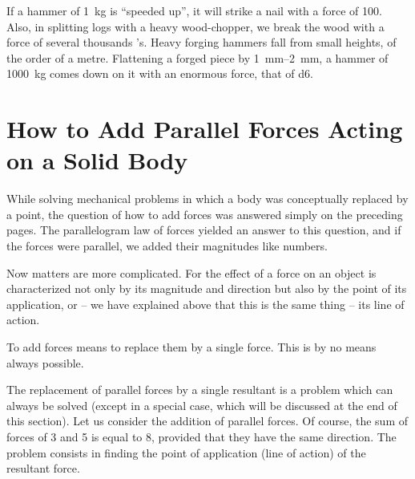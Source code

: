 If a hammer of \SI{1}{\kilo\gram} is ``speeded up'', it will strike a
nail with a force of \SI{100}{\kgf}. Also, in splitting logs with
a heavy wood-chopper, we break the wood with a force of
several thousands \si{\kgf}'s. Heavy forging hammers fall
from small heights, of the order of a metre. Flattening
a forged piece by \SIrange{1}{2}{\milli\meter}, a hammer of \SI{1000}{\kilo\gram} comes
down on it with an enormous force, that of \SI{d6}{\kgf}.

\section[Adding Parallel Forces Acting on a Solid Body]{How to Add Parallel Forces Acting on a Solid Body}

While solving mechanical problems in which a body
was conceptually replaced by a point, the question of
how to add forces was answered simply on the preceding
pages. The parallelogram law of forces yielded an answer
to this question, and if the forces were parallel, we added
their magnitudes like numbers.

Now matters are more complicated. For the effect of a force on an object is characterized not only by its magnitude and direction but also by the point of its application, or -- we have explained above that this is the same thing -- its line of action.

To add forces means to replace them by a single force. This is by no means always possible.

The replacement of parallel forces by a single resultant
is a problem which can always be solved (except in a
special case, which will be discussed at the end of this
section). Let us consider the addition of parallel forces.
Of course, the sum of forces of \SI{3}{\kgf} and \SI{5}{\kgf} is equal to
\SI{8}{\kgf}, provided that they have the same direction. The
problem consists in finding the point of application (line
of action) of the resultant force.

